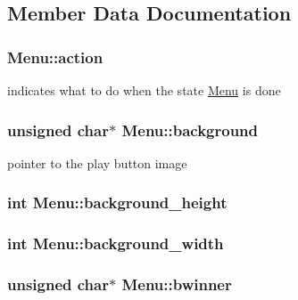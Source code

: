 \subsection{Member Data Documentation}
\subsubsection[{\texorpdfstring{action}{action}}]{ Menu\+::action}\hypertarget{structMenu_a01fc9d0084bc760f9d1e66462a8a75b7}{}\label{structMenu_a01fc9d0084bc760f9d1e66462a8a75b7}
indicates what to do when the state \hyperlink{structMenu}{Menu} is done 
\subsubsection[{\texorpdfstring{background}{background}}]{\setlength{\rightskip}{0pt plus 5cm}unsigned char$\ast$ Menu\+::background}\hypertarget{structMenu_ae1afb1a4c1a48995dbc99aba8cb3ea09}{}\label{structMenu_ae1afb1a4c1a48995dbc99aba8cb3ea09}
pointer to the play button image 
\subsubsection[{\texorpdfstring{background\+\_\+height}{background_height}}]{\setlength{\rightskip}{0pt plus 5cm}int Menu\+::background\+\_\+height}\hypertarget{structMenu_a9766ba80e9f48d5ca685572724be1a1f}{}\label{structMenu_a9766ba80e9f48d5ca685572724be1a1f}
\subsubsection[{\texorpdfstring{background\+\_\+width}{background_width}}]{\setlength{\rightskip}{0pt plus 5cm}int Menu\+::background\+\_\+width}\hypertarget{structMenu_a58782cb93b5c0be925192ec69430abff}{}\label{structMenu_a58782cb93b5c0be925192ec69430abff}
\subsubsection[{\texorpdfstring{bwinner}{bwinner}}]{\setlength{\rightskip}{0pt plus 5cm}unsigned char$\ast$ Menu\+::bwinner}\hypertarget{structMenu_a99635834abf927c6f5a1e48d7aa443fd}{}\label{structMenu_a99635834abf927c6f5a1e48d7aa443fd}
